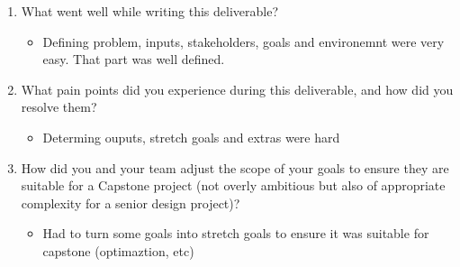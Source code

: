 \documentclass{article}
\begin{document}


\begin{enumerate}
    \item What went well while writing this deliverable? 
    \begin{itemize}
        \item Defining problem, inputs, stakeholders, goals and environemnt were very easy. That part was well defined.
    \end{itemize}
    \item What pain points did you experience during this deliverable, and how
    did you resolve them?
    \begin{itemize}
        \item Determing ouputs, stretch goals and extras were hard
    \end{itemize}
        \item How did you and your team adjust the scope of your goals to ensure
    they are suitable for a Capstone project (not overly ambitious but also of
    appropriate complexity for a senior design project)?
    \begin{itemize}
        \item Had to turn some goals into stretch goals to ensure it was suitable for capstone (optimaztion, etc)
    \end{itemize}
\end{enumerate}  
\end{document}
